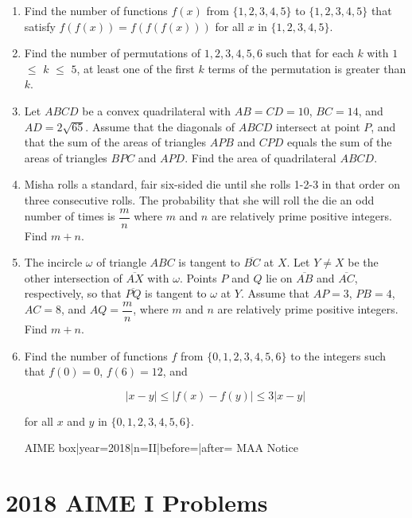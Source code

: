\documentclass{article}
\begin{document}
\begin{enumerate}[label=\arabic*., itemsep=0.5em]
\par \vspace{0.5em}\item Find the number of functions \(f(x)\) from \(\{1, 2, 3, 4, 5\}\) to \(\{1, 2, 3, 4, 5\}\) that satisfy \(f(f(x)) = f(f(f(x)))\) for all \(x\) in \(\{1, 2, 3, 4, 5\}\).\par \vspace{0.5em}\item Find the number of permutations of \(1, 2, 3, 4, 5, 6\) such that for each \(k\) with \(1\) \(\leq\) \(k\) \(\leq\) \(5\), at least one of the first \(k\) terms of the permutation is greater than \(k\).\par \vspace{0.5em}\item Let \(ABCD\) be a convex quadrilateral with \(AB = CD = 10\), \(BC = 14\), and \(AD = 2\sqrt{65}\). Assume that the diagonals of \(ABCD\) intersect at point \(P\), and that the sum of the areas of triangles \(APB\) and \(CPD\) equals the sum of the areas of triangles \(BPC\) and \(APD\). Find the area of quadrilateral \(ABCD\).\par \vspace{0.5em}\item Misha rolls a standard, fair six-sided die until she rolls 1-2-3 in that order on three consecutive rolls. The probability that she will roll the die an odd number of times is \(\dfrac{m}{n}\) where \(m\) and \(n\) are relatively prime positive integers. Find \(m+n\).\par \vspace{0.5em}\item The incircle \(\omega\) of triangle \(ABC\) is tangent to \(\overline{BC}\) at \(X\). Let \(Y \neq X\) be the other intersection of \(\overline{AX}\) with \(\omega\). Points \(P\) and \(Q\) lie on \(\overline{AB}\) and \(\overline{AC}\), respectively, so that \(\overline{PQ}\) is tangent to \(\omega\) at \(Y\). Assume that \(AP = 3\), \(PB = 4\), \(AC = 8\), and \(AQ = \dfrac{m}{n}\), where \(m\) and \(n\) are relatively prime positive integers. Find \(m+n\).\par \vspace{0.5em}\item Find the number of functions \(f\) from \(\{0, 1, 2, 3, 4, 5, 6\}\) to the integers such that \(f(0) = 0\), \(f(6) = 12\), and


\begin{equation*}
|x - y|  \leq  |f(x) - f(y)|  \leq  3|x - y|
\end{equation*}


for all \(x\) and \(y\) in \(\{0, 1, 2, 3, 4, 5, 6\}\).



{{AIME box|year=2018|n=II|before=|after=}}
{{MAA Notice}}\par \vspace{0.5em}\end{enumerate}\newpage\section*{2018 AIME I Problems}
\end{document}
